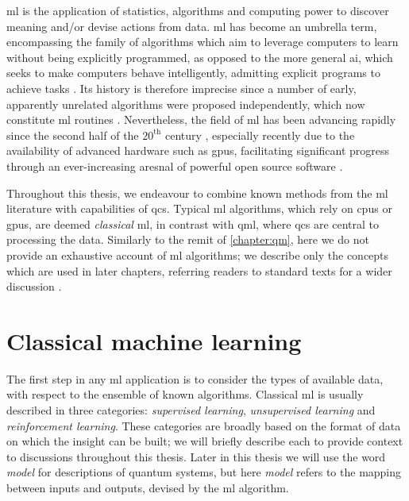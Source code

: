 
\Gls{ml} is the application of statistics, algorithms and computing power to discover meaning and/or devise actions from data.
\gls{ml} has become an umbrella term, encompassing the family of algorithms
    which aim to leverage computers to learn without being explicitly programmed,
    as opposed to the more general \gls{ai}, which seeks to make computers behave intelligently,
    admitting explicit programs to achieve tasks \cite{MLvAI}.
Its history is therefore imprecise since a number of early, apparently unrelated algorithms were proposed independently, 
    which now constitute \gls{ml} routines \cite{mcculloch1943logical, turing2009computing}. 
Nevertheless, the field of \gls{ml} has been advancing rapidly since the second half of the $20^{\textrm{th}}$ century \cite{russell2002artificial}, 
    especially recently due to the availability of advanced hardware such as \glspl{gpu}, 
    facilitating significant progress through an ever-increasing aresnal of powerful open source software \cite{pedregosa2011scikit, abadi2016tensorflow, paszke2019pytorch}. 
\par 

Throughout this thesis, we endeavour to combine known methods from the \gls{ml} literature with capabilities of \glspl{qc}\footnotemark. 
Typical \gls{ml} algorithms, which rely on \glspl{cpu} or \glspl{gpu}, are deemed \emph{classical} \acrlong{ml},
    in contrast with \gls{qml}, where \glspl{qc} are central to processing the data.
Similarly to the remit of \cref{chapter:qm}, here we do not provide an exhaustive account of \gls{ml} algorithms;
    we describe only the concepts which are used in later chapters, 
    referring readers to standard texts for a wider discussion \cite{russell2002artificial, hastie2009elements}.



\section{Classical machine learning}\label{sec:classical_ml}

The first step in any \gls{ml} application is to consider the types of available data,
    with respect to the ensemble of known algorithms. 
Classical \gls{ml} is usually described in three categories:
    \emph{supervised learning}, \emph{unsupervised learning} and \emph{reinforcement learning}.  
These categories are broadly based on the format of data on which the insight can be built;
    we will briefly describe each to provide context to discussions throughout this thesis. 
Later in this thesis we will use the word \emph{model} for descriptions of quantum systems, 
    but here \emph{model} refers to the mapping between inputs and outputs, devised by the \gls{ml} algorithm.
\par 

